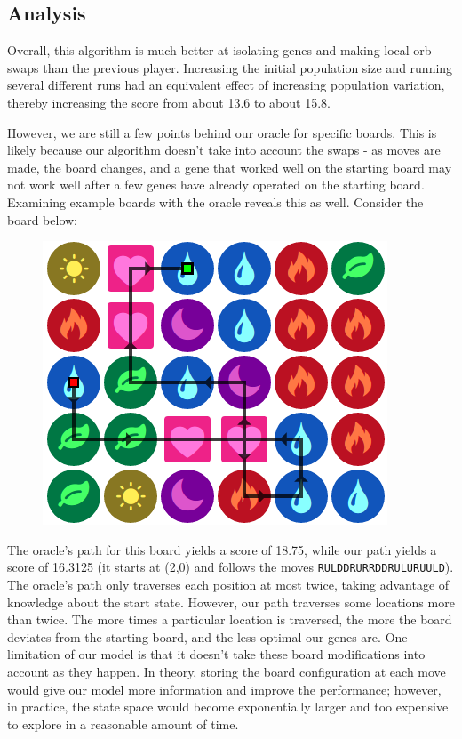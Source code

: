 \documentclass[journal,final,letterpaper,11pt]{IEEEtran}
\begin{document}
\subsection{Analysis}
Overall, this algorithm is much better at isolating genes and making local orb swaps than the previous player. Increasing the initial population size and running several different runs had an equivalent effect of increasing population variation, thereby increasing the score from about 13.6 to about 15.8. 

However, we are still a few points behind our oracle for specific boards. This is likely because our algorithm doesn't take into account the swaps - as moves are made, the board changes, and a gene that worked well on the starting board may not work well after a few genes have already operated on the starting board. Examining example boards with the oracle reveals this as well. Consider the board below:

\begin{figure}[h]
\centering
\includegraphics[scale=0.5]{Pad_Analysis_Path.png}
\end{figure}

The oracle's path for this board yields a score of 18.75, while our path yields a score of 16.3125 (it starts at (2,0) and follows the moves \verb+RULDDRURRDDRULURUULD+). The oracle's path only traverses each position at most twice, taking advantage of knowledge about the start state. However, our path traverses some locations more than twice. The more times a particular location is traversed, the more the board deviates from the starting board, and the less optimal our genes are. One limitation of our model is that it doesn't take these board modifications into account as they happen. In theory, storing the board configuration at each move would give our model more information and improve the performance; however, in practice, the state space would become exponentially larger and too expensive to explore in a reasonable amount of time.
\end{document}
